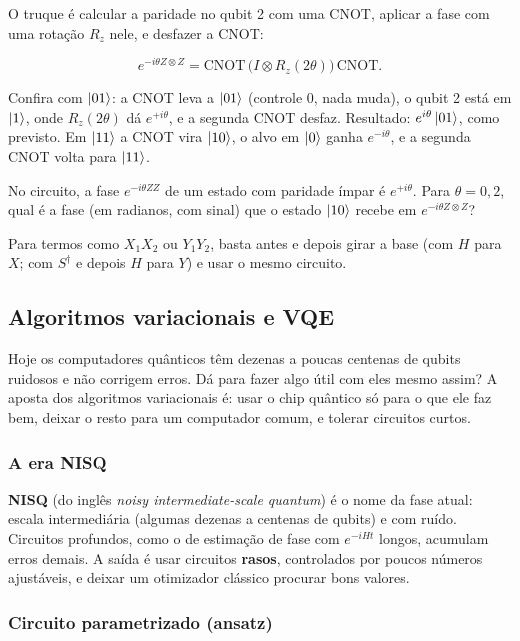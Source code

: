 O truque é calcular a paridade no qubit 2 com uma CNOT, aplicar a fase com uma rotação \(R_z\) nele, e desfazer a CNOT:

\[
e^{-i\theta Z\otimes Z} = \text{CNOT}\,\big(I\otimes R_z(2\theta)\big)\,\text{CNOT}.
\]

Confira com \(\left|{01}\right>\): a CNOT leva a \(\left|{01}\right>\) (controle 0, nada muda), o qubit 2 está em \(\left|{1}\right>\), onde \(R_z(2\theta)\) dá \(e^{+i\theta}\), e a segunda CNOT desfaz. Resultado: \(e^{i\theta}\left|{01}\right>\), como previsto. Em \(\left|{11}\right>\) a CNOT vira \(\left|{10}\right>\), o alvo em \(\left|{0}\right>\) ganha \(e^{-i\theta}\), e a segunda CNOT volta para \(\left|{11}\right>\).

No circuito, a fase \(e^{-i\theta ZZ}\) de um estado com paridade ímpar é \(e^{+i\theta}\). Para \(\theta = 0{,}2\), qual é a fase (em radianos, com sinal) que o estado \(\left|{10}\right>\) recebe em \(e^{-i\theta Z\otimes Z}\)?

Para termos como \(X_1X_2\) ou \(Y_1Y_2\), basta antes e depois girar a base (com \(H\) para \(X\); com \(S^\dagger\) e depois \(H\) para \(Y\)) e usar o mesmo circuito.

\subsection{Algoritmos variacionais e VQE}
Hoje os computadores quânticos têm dezenas a poucas centenas de qubits ruidosos e não corrigem erros. Dá para fazer algo útil com eles mesmo assim? A aposta dos algoritmos variacionais é: usar o chip quântico só para o que ele faz bem, deixar o resto para um computador comum, e tolerar circuitos curtos.

\subsubsection{A era NISQ}\label{a-era-nisq}

\textbf{NISQ} (do inglês \emph{noisy intermediate-scale quantum}) é o nome da fase atual: escala intermediária (algumas dezenas a centenas de qubits) e com ruído. Circuitos profundos, como o de estimação de fase com \(e^{-iHt}\) longos, acumulam erros demais. A saída é usar circuitos \textbf{rasos}, controlados por poucos números ajustáveis, e deixar um otimizador clássico procurar bons valores.

\subsubsection{Circuito parametrizado (ansatz)}\label{circuito-parametrizado-ansatz}

